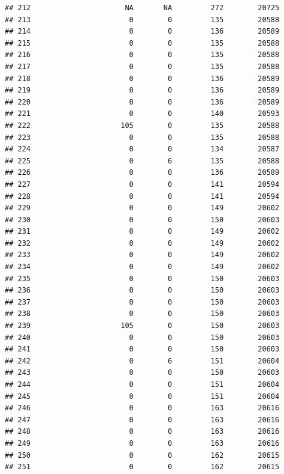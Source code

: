 \documentclass[
]{article}
\begin{document}
\begin{verbatim}
## 212                      NA       NA         272        20725
## 213                       0        0         135        20588
## 214                       0        0         136        20589
## 215                       0        0         135        20588
## 216                       0        0         135        20588
## 217                       0        0         135        20588
## 218                       0        0         136        20589
## 219                       0        0         136        20589
## 220                       0        0         136        20589
## 221                       0        0         140        20593
## 222                     105        0         135        20588
## 223                       0        0         135        20588
## 224                       0        0         134        20587
## 225                       0        6         135        20588
## 226                       0        0         136        20589
## 227                       0        0         141        20594
## 228                       0        0         141        20594
## 229                       0        0         149        20602
## 230                       0        0         150        20603
## 231                       0        0         149        20602
## 232                       0        0         149        20602
## 233                       0        0         149        20602
## 234                       0        0         149        20602
## 235                       0        0         150        20603
## 236                       0        0         150        20603
## 237                       0        0         150        20603
## 238                       0        0         150        20603
## 239                     105        0         150        20603
## 240                       0        0         150        20603
## 241                       0        0         150        20603
## 242                       0        6         151        20604
## 243                       0        0         150        20603
## 244                       0        0         151        20604
## 245                       0        0         151        20604
## 246                       0        0         163        20616
## 247                       0        0         163        20616
## 248                       0        0         163        20616
## 249                       0        0         163        20616
## 250                       0        0         162        20615
## 251                       0        0         162        20615

\end{verbatim}
\end{document}
